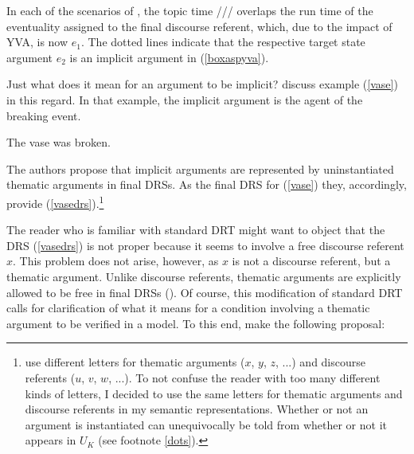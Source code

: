 \documentclass[output=paper,colorlinks,citecolor=brown]{langscibook}
\begin{document}
\begin{figure}
\begin{subfigure}[b]{.3\linewidth}
\caption{}
\label{pice}
\end{subfigure}\hfill
\begin{subfigure}[b]{.3\linewidth}
\centering
{}
\caption{}
\label{picf}
\end{subfigure}\hfill
\end{figure}

In each of the scenarios of , the topic time /// overlaps the run time of the eventuality assigned to the final discourse referent,
which, due to the impact of YVA, is now $e_1$. The dotted lines indicate that the respective target state argument $e_2$ is an implicit argument in (\ref{boxaspyva}). 

Just what does it mean for an argument to be implicit? \citet[61]{FarkasdeSwart2003} discuss example (\ref{vase}) in this regard. In that example, the implicit argument is the agent of the breaking event. 

 \ea\label{vase}
The vase was broken.
\z 

\noindent The authors propose that implicit arguments are represented by uninstantiated thematic arguments in final DRSs. As the final DRS for (\ref{vase}) they, accordingly, provide (\ref{vasedrs}).\footnote{\label{letters}\citet{FarkasdeSwart2003} use different letters for thematic arguments ($x$, $y$, $z$, ...) and discourse referents ($u$, $v$, $w$, ...). To not confuse the reader with too many different kinds of letters, I decided to use the same letters for thematic arguments and discourse referents in my semantic representations. Whether or not an argument is instantiated can unequivocally be told from whether or not it appears in $U_K$ (see footnote \ref{dots}).}


\noindent The reader who is familiar with standard DRT might want to object that the DRS (\ref{vasedrs}) is not proper because it seems to involve a free discourse referent $x$. This problem does not arise, however, as $x$ is not a discourse referent, but a thematic argument. Unlike discourse referents, thematic arguments are explicitly allowed to be free in final DRSs (\citealt[60]{FarkasdeSwart2003}). Of course, this modification of standard DRT calls for clarification of what it means for a condition involving a thematic argument to be verified in a model. To this end, \citet[63]{FarkasdeSwart2003} make the following proposal:
\end{document}
